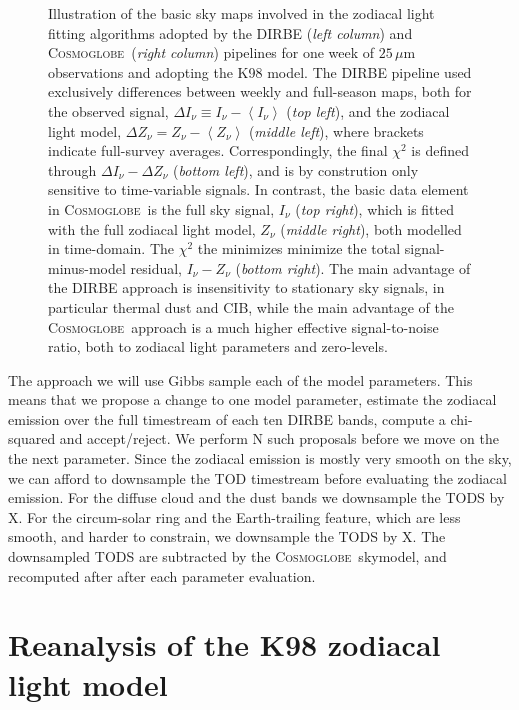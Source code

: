 \documentclass{aa}
\def\Cosmoglobe{\textsc{Cosmoglobe}}
\begin{document}
\begin{figure}
    \caption{Illustration of the basic sky maps involved in the zodiacal light fitting algorithms adopted by the DIRBE (\emph{left column}) and \Cosmoglobe\ (\emph{right column}) pipelines for one week of $25\,\mu\mathrm{m}$ observations and adopting the K98 model. The DIRBE pipeline used exclusively differences between weekly and full-season maps, both for the observed signal, $\Delta I_{\nu} \equiv I_{\nu}-\left<I_{\nu}\right>$ (\emph{top left}), and the zodiacal light model, $\Delta Z_{\nu} = Z_{\nu}-\left<Z_{\nu}\right>$ (\emph{middle left}), where brackets indicate full-survey averages. Correspondingly, the final $\chi^2$ is defined through $\Delta I_{\nu} - \Delta Z_{\nu}$ (\emph{bottom left}), and is by constrution only sensitive to time-variable signals. In contrast, the basic data element in \Cosmoglobe\ is the full sky signal, $I_{\nu}$ (\emph{top right}), which is fitted with the full zodiacal light model, $Z_{\nu}$ (\emph{middle right}), both modelled in time-domain. The $\chi^2$ the minimizes minimize the total signal-minus-model residual, $I_{\nu}-Z_{\nu}$ (\emph{bottom right}). The main advantage of the DIRBE approach is insensitivity to stationary sky signals, in particular thermal dust and CIB, while the main advantage of the \Cosmoglobe\ approach is a much higher effective signal-to-noise ratio, both to zodiacal light parameters and zero-levels.}
    \label{fig:week_vs_full}
  \end{figure}


The approach we will use Gibbs sample each of the model parameters. This means that we propose a change to one model parameter, estimate the zodiacal emission over the full timestream of each ten DIRBE bands, compute a chi-squared and accept/reject. We perform N such proposals before we move on the the next parameter. Since the zodiacal emission is mostly very smooth on the sky, we can afford to downsample the TOD timestream before evaluating the zodiacal emission. For the diffuse cloud and the dust bands we downsample the TODS by X. For the circum-solar ring and the Earth-trailing feature, which are less smooth, and harder to constrain, we downsample the TODS by X. The downsampled TODS are subtracted by the \Cosmoglobe\ skymodel, and recomputed after after each parameter evaluation. 








\clearpage
\section{Reanalysis of the K98 zodiacal light model}
\end{document}
